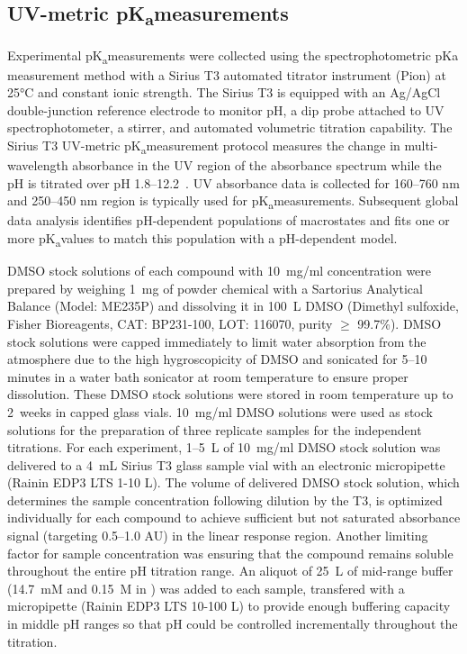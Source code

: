 \documentclass[9pt,lineno]{elife}
\newcommand{\pKa}{pK\textsubscript{a}}
\begin{document}
\subsection{UV-metric \pKa measurements}

Experimental \pKa measurements were collected using the spectrophotometric pKa measurement method with a Sirius T3 automated titrator instrument (Pion) at 25°C and constant ionic strength. 
The Sirius T3 is equipped with an Ag/AgCl double-junction reference electrode to monitor pH, a dip probe attached to UV spectrophotometer, a stirrer, and automated volumetric titration capability. 
The Sirius T3 UV-metric \pKa measurement protocol measures the change in multi-wavelength absorbance in the UV region of the absorbance spectrum while the pH is titrated over pH 1.8--12.2~\citep{tam_multi-wavelength_2001, allen_multiwavelength_1998}. UV absorbance data is collected for 160--760 nm and 250--450 nm region is typically used for \pKa measurements.
Subsequent global data analysis identifies pH-dependent populations of macrostates and fits one or more \pKa values to match this population with a pH-dependent model.

DMSO stock solutions of each compound with 10~mg/ml concentration were prepared by weighing 1~mg of powder chemical with a Sartorius Analytical Balance (Model: ME235P) and dissolving it in 100~{\micro}L DMSO (Dimethyl sulfoxide, Fisher Bioreagents, CAT: BP231-100, LOT: 116070, purity $\geq$ 99.7\%).  
DMSO stock solutions were capped immediately to limit water absorption from the atmosphere due to the high hygroscopicity of DMSO and sonicated for 5--10 minutes in a water bath sonicator at room temperature to ensure proper dissolution. 
These DMSO stock solutions were stored in room temperature up to 2~weeks in capped glass vials. 
10~mg/ml DMSO solutions were used as stock solutions for the preparation of three replicate samples for the independent titrations.  For each experiment, 1--5~{\micro}L of 10~mg/ml DMSO stock solution was delivered to a 4~mL Sirius T3 glass sample vial with an electronic micropipette (Rainin EDP3 LTS 1-10 \micro L). 
The volume of delivered DMSO stock solution, which determines the sample concentration following dilution by the T3, is optimized individually for each compound to achieve sufficient but not saturated absorbance signal (targeting 0.5--1.0 AU) in the linear response region. 
Another limiting factor for sample concentration was ensuring that the compound remains soluble throughout the entire pH titration range. An aliquot of
25~{\micro}L of mid-range buffer (14.7~mM  and 0.15~M  in ) was added to each sample, transfered with a micropipette (Rainin EDP3 LTS 10-100 \micro L) to provide enough buffering capacity in middle pH ranges so that pH could be controlled incrementally throughout the titration.  
\end{document}
